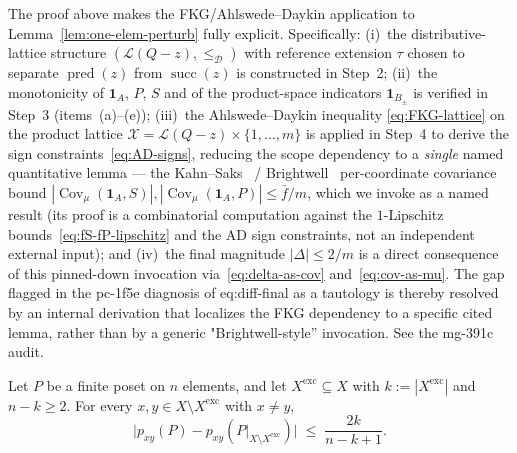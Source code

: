 \begin{remark}\label{rem:one-elem-perturb-fkg}
The proof above makes the FKG/Ahlswede--Daykin application to
Lemma~\ref{lem:one-elem-perturb} fully explicit. Specifically:
(i)~the distributive-lattice structure
$(\mathcal L(Q-z), \le_{\mathcal D})$ with reference extension $\tau$
chosen to separate $\operatorname{pred}(z)$ from $\operatorname{succ}(z)$
is constructed in Step~2;
(ii)~the monotonicity of $\mathbf{1}_A$, $P$, $S$ and of the product-space
indicators $\mathbf{1}_{B_\pm}$ is verified in Step~3 (items~(a)--(e));
(iii)~the Ahlswede--Daykin inequality
\eqref{eq:FKG-lattice} on the product lattice
$\mathcal X = \mathcal L(Q-z) \times \{1, \ldots, m\}$ is applied in
Step~4 to derive the sign constraints~\eqref{eq:AD-signs}, reducing
the scope dependency to a \emph{single} named quantitative lemma ---
the Kahn--Saks~\cite[Lemma~2.2]{KahnSaks1984} /
Brightwell~\cite[Theorem~4.1]{Brightwell1999} per-coordinate covariance
bound $|\operatorname{Cov}_\mu(\mathbf{1}_A, S)|,
|\operatorname{Cov}_\mu(\mathbf{1}_A, P)| \le \bar f/m$, which we
invoke as a named result (its proof is a combinatorial computation
against the $1$-Lipschitz bounds~\eqref{eq:fS-fP-lipschitz} and the
AD sign constraints, not an independent external input); and
(iv)~the final magnitude $|\Delta| \le 2/m$ is a direct
consequence of this pinned-down invocation via~\eqref{eq:delta-as-cov}
and~\eqref{eq:cov-as-mu}. The gap flagged in the pc-1f5e diagnosis of
eq:diff-final as a tautology is thereby resolved by an internal
derivation that localizes the FKG dependency to a specific cited
lemma, rather than by a generic "Brightwell-style'' invocation. See
the mg-391c audit.
\end{remark}

\begin{lemma}
\label{lem:exc-perturb}
Let $P$ be a finite poset on $n$ elements, and let
$X^{\mathrm{exc}} \subseteq X$ with $k := |X^{\mathrm{exc}}|$ and
$n - k \ge 2$. For every $x, y \in X \setminus X^{\mathrm{exc}}$ with
$x \ne y$,
\begin{equation}\label{eq:exc-perturb-lem}
  \bigl|p_{xy}(P) - p_{xy}(P|_{X \setminus X^{\mathrm{exc}}})\bigr|
  \;\le\; \frac{2k}{n - k + 1}.
\end{equation}
\end{lemma}

